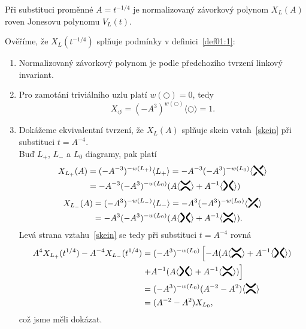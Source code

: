 \begin{tvrz}\label{t01:6}
Při substituci proměnné $A = t^{-1/4}$ je normalizovaný závorkový polynom $X_L(A)$  roven Jonesovu polynomu $V_L(t)$.
\end{tvrz}
\begin{dukaz}
Ověříme, že $X_L(t^{-1/4})$ splňuje podmínky v definici~\ref{def01:1}:

\begin{enumerate}
\item
Normalizovaný závorkový polynom je podle předchozího tvrzení linkový invariant.
\item
Pro zamotání triviálního uzlu platí $w( \pmb{\bigcirc}) = 0$, tedy $$X_{\pmb{\circlearrowleft}} = (-A^3)^{w( \pmb{\bigcirc})} \langle \pmb{\bigcirc} \rangle = 1.$$ 
\item
Dokážeme ekvivalentní tvrzení, že $X_L(A)$ splňuje skein vztah~\ref{skein} při substituci $t=A^{-4}$. \\ Buď $L_+$, $ L_-$ a $L_0$ diagramy, pak platí
\begin{equation*}
\begin{split}
X_{L_+}(A) & = (-A^{-3})^{-w(L_+)} \langle L_+ \rangle = -A^{-3} (-A^3)^{-w(L_0)}  \langle \minuskriz  \rangle \\ & = -A^{-3} (-A^3)^{-w(L_0)} (A \langle \horkriz \rangle + A^{-1}  \langle \vertkriz \rangle)
\end{split}
\end{equation*}
\begin{equation*}
\begin{split}
X_{L_-}(A) & = (-A^{3})^{-w(L_-)} \langle L_- \rangle = -A^{3} (-A^3)^{-w(L_0)}  \langle \pluskriz  \rangle \\ & = -A^{3} (-A^3)^{-w(L_0)} (A \langle \vertkriz \rangle + A^{-1}  \langle \horkriz \rangle) .
\end{split}
\end{equation*}
Levá strana vztahu~\ref{skein} se tedy při substituci $t=A^{-4}$ rovná
\begin{equation*}
\begin{split}
A^4 X_{L_+}(t^{1/4})  - A^{-4} X_{L_-} (t^{1/4}) &  =  (-A^3)^{-w(L_0)} \left[ -A  (A \langle \horkriz \rangle + A^{-1}  \langle \vertkriz \rangle ) \right. \\ & \left. + A^{-1} (A \langle \vertkriz \rangle + A^{-1}  \langle \horkriz \rangle) \right] \\ & = (-A^3)^{-w(L_0)} (A^{-2} -A^2) \langle \horkriz \rangle \\ & =  (A^{-2} -A^2) X_{L_0},
\end{split}
\end{equation*}
což jsme měli dokázat.
\end{enumerate}
$ $
\end{dukaz}
